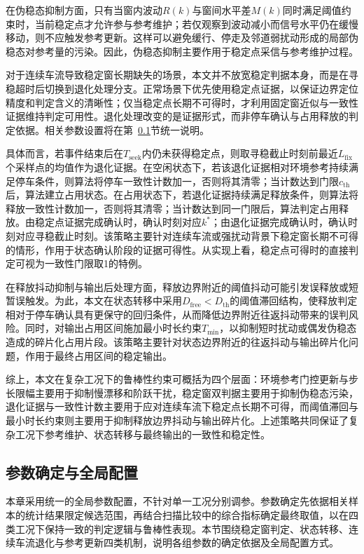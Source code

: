 \documentclass{xdupgthesis}
\begin{document}
在伪稳态抑制方面，只有当窗内波动$R(k)$与窗间水平差$M(k)$同时满足阈值约束时，当前稳定点才允许参与参考维护；若仅观察到波动减小而信号水平仍在缓慢移动，则不应触发参考更新。这样可以避免缓行、停走及邻道弱扰动形成的局部伪稳态对参考量的污染。因此，伪稳态抑制主要作用于稳定点采信与参考维护过程。

对于连续车流导致稳定窗长期缺失的场景，本文并不放宽稳定判据本身，而是在寻稳超时后切换到退化处理分支。正常场景下优先使用稳定点证据，以保证边界定位精度和判定含义的清晰性；仅当稳定点长期不可得时，才利用固定窗近似与一致性证据维持判定可用性。退化处理改变的是证据形式，而非停车确认与占用释放的判定依据。相关参数设置将在第~\ref{subsec:ch4_paramset}节统一说明。

具体而言，若事件结束后在$T_{\mathrm{seek}}$内仍未获得稳定点，则取寻稳截止时刻前最近$L_{\mathrm{fix}}$个采样点的均值作为退化证据。在空闲状态下，若该退化证据相对环境参考持续满足停车条件，则算法将停车一致性计数加一，否则将其清零；当计数达到门限$c_{\mathrm{th}}$后，算法建立占用状态。在占用状态下，若退化证据持续满足释放条件，则算法将释放一致性计数加一，否则将其清零；当计数达到同一门限后，算法判定占用释放。由稳定点证据完成确认时，确认时刻对应$k^\ast$；由退化证据完成确认时，确认时刻对应寻稳截止时刻。该策略主要针对连续车流或强扰动背景下稳定窗长期不可得的情形，作用于状态确认阶段的证据可得性。从实现上看，稳定点可得时的直接判定可视为一致性门限取1的特例。

在释放抖动抑制与输出后处理方面，释放边界附近的阈值抖动可能引发误释放或短暂误触发。为此，本文在状态转移中采用$D_{\mathrm{free}}<D_{\mathrm{th}}$的阈值滞回结构，使释放判定相对于停车确认具有更保守的回归条件，从而降低边界附近往返抖动带来的误判风险。同时，对输出占用区间施加最小时长约束$T_{\min}$，以抑制短时扰动或偶发伪稳态造成的碎片化占用片段。该策略主要针对状态边界附近的往返抖动与输出碎片化问题，作用于最终占用区间的稳定输出。

综上，本文在复杂工况下的鲁棒性约束可概括为四个层面：环境参考门控更新与步长限幅主要用于抑制慢漂移和阶跃干扰，稳定窗双判据主要用于抑制伪稳态污染，退化证据与一致性计数主要用于应对连续车流下稳定点长期不可得，而阈值滞回与最小时长约束则主要用于抑制释放边界抖动与输出碎片化。上述策略共同保证了复杂工况下参考维护、状态转移与最终输出的一致性和稳定性。

\subsection{参数确定与全局配置}
\label{subsec:ch4_paramset}

本章采用统一的全局参数配置，不针对单一工况分别调参。参数确定先依据相关样本的统计结果限定候选范围，再结合扫描比较中的综合指标确定最终取值，以在四类工况下保持一致的判定逻辑与鲁棒性表现。本节围绕稳定窗判定、状态转移、连续车流退化与参考更新四类机制，说明各组参数的确定依据及全局配置方式。
\end{document}
